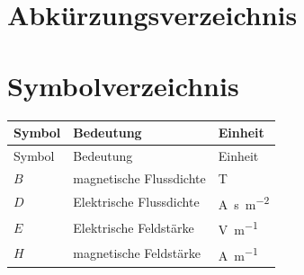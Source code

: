 \documentclass[12pt,a4paper,oneside,numbers=noenddot,headsepline,captions=tableheading,toc=bibliography,openany]{scrbook}
\begin{document}
\onehalfspacing
\cleardoublepage
%
\cleardoublepage
 
 \tableofcontents
 \cleardoublepage

\chapter*{Abkürzungsverzeichnis}
\begin{acronym}[PMSM]	%
\end{acronym}
\cleardoublepage

\pagestyle{plain}

\chapter*{Symbolverzeichnis}

\begin{longtable}{p{3cm}p{8cm}p{2cm}}
	\setlength\tabcolsep{9pt}
Symbol & Bedeutung                & Einheit               \\ \hline
	\endfirsthead
Symbol             & Bedeutung                & Einheit               \\ \hline
	\endhead
	\toprule
	$B$			& magnetische Flussdichte				& \si{\tesla} \\
	$D$			& Elektrische Flussdichte				& \si{\ampere\second\per\square\meter} \\
$E$			& Elektrische Feldstärke				& \si{\volt\per\meter} \\
$H$			& magnetische Feldstärke				& \si{\ampere\per\meter} \\

\bottomrule
\end{longtable}


\cleardoublepage
\pagestyle{headings}
\setlength{\parskip}{0.1em}
\end{document}
